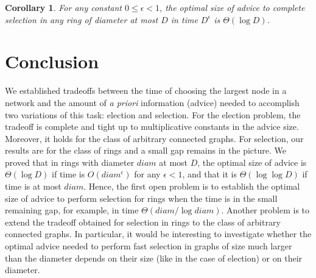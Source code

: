 \documentclass[11pt]{article}
\newtheorem{corollary}{Corollary}[section]
\begin{document}
\begin{corollary}
For any constant $0 \leq\epsilon < 1$,
the optimal size of advice to complete selection in any ring of diameter at most $D$ in time $D^{\epsilon}$  is $\Theta(\log D)$.
\end{corollary} 








\section{Conclusion}

We established tradeoffs between the time of choosing the largest node in a network and the amount of {\em a priori} information (advice) needed
to accomplish two variations of this task: election and selection. For the election problem, the tradeoff is complete and tight up to multiplicative constants
in the advice size.
Moreover, it holds for the class of arbitrary connected graphs.
For selection, our results are for the class of rings and a small gap remains in the picture. 
We proved that in rings with diameter $diam$ at most $D$, 
the optimal size of advice is $\Theta(\log D)$ if time is
$O(diam^{\epsilon})$ for any $\epsilon <1$, and that it is $\Theta(\log \log D)$ if time is at most $diam$.
Hence, the first open problem is to establish the optimal size of advice to perform selection for rings when the time is in the small remaining gap, for example, in time $\Theta(diam/\log diam)$.  Another problem is to extend the tradeoff obtained for selection in rings to the class
of arbitrary connected graphs. In particular, it would be interesting to investigate whether the optimal advice needed to perform fast selection in graphs of size much larger
than the diameter depends on their size (like in the case of election) or on their diameter.
\end{document}
